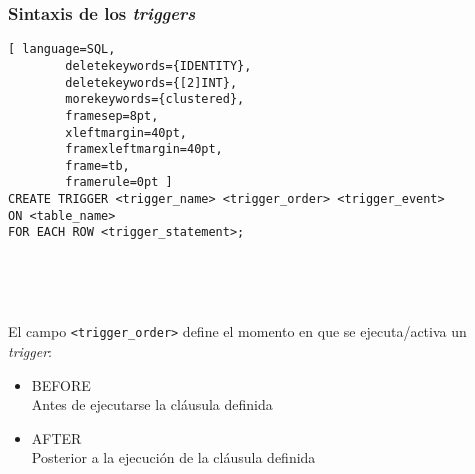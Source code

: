 \begin{frame}[fragile]
	
	\frametitle{Sintaxis de los \emph{triggers}}
	
	\begin{lstlisting}[ language=SQL,
		deletekeywords={IDENTITY},
		deletekeywords={[2]INT},
		morekeywords={clustered},
		framesep=8pt,
		xleftmargin=40pt,
		framexleftmargin=40pt,
		frame=tb,
		framerule=0pt ]
CREATE TRIGGER <trigger_name> <trigger_order> <trigger_event> 
ON <table_name> 
FOR EACH ROW <trigger_statement>;
\end{lstlisting}

	\ 
	
	\ 
	
	\pause
	
	El campo \texttt{<trigger\_order>} define el momento en que se ejecuta/activa un \emph{trigger}:
	
	\begin{itemize}
		
		\item \textcolor{codepurple}{BEFORE} 
		\\ Antes de ejecutarse la cláusula definida
		
		\item \textcolor{codepurple}{AFTER} 
		\\ Posterior a la ejecución de la cláusula definida
		
	\end{itemize}
	
\end{frame}


